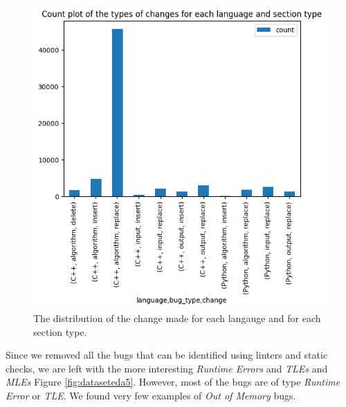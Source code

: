 \documentclass[12pt,a4paper]{report}
\begin{document}
\begin{figure}[hp!]
\centering
\includegraphics[width=\textwidth]{pics/submissionchangecount.png}
  \caption{The distribution of the change made for each langauge and for each section type.}
  \label{fig:dataseteda4}
\end{figure}

\newpage

Since we removed all the bugs that can be identified using linters and static checks, we are left with the more interesting \textit{Runtime Errors} and \textit{TLEs} and \textit{MLEs} Figure \ref{fig:dataseteda5}. However, most of the bugs are of type \textit{Runtime Error} or \textit{TLE}. We found very few examples of \textit{Out of Memory} bugs.
\end{document}
